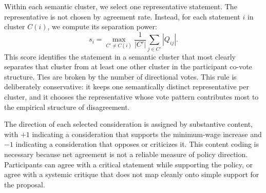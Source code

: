 Within each semantic cluster, we select one representative statement. The
representative is not chosen by agreement rate. Instead, for each statement $i$
in cluster $C(i)$, we compute its separation power:
\[
s_i = \max_{C' \neq C(i)}
\frac{1}{|C'|}\sum_{j \in C'} |Q_{ij}|.
\]
This score identifies the statement in a semantic cluster that most clearly
separates that cluster from at least one other cluster in the participant
co-vote structure. Ties are broken by the number of directional votes. This
rule is deliberately conservative: it keeps one semantically distinct
representative per cluster, and it chooses the representative whose vote
pattern contributes most to the empirical structure of disagreement.

The direction of each selected consideration is assigned by substantive
content, with $+1$ indicating a consideration that supports the minimum-wage
increase and $-1$ indicating a consideration that opposes or criticizes it.
This content coding is necessary because net agreement is not a reliable
measure of policy direction. Participants can agree with a critical statement
while supporting the policy, or agree with a systemic critique that does not
map cleanly onto simple support for the proposal.

